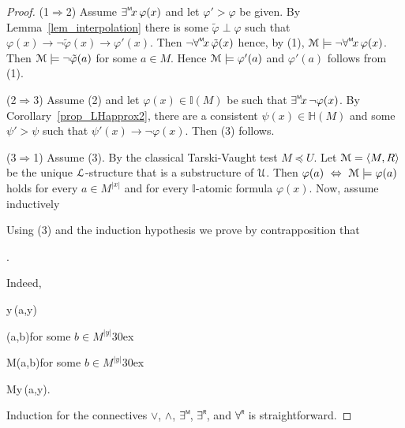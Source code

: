 \documentclass[11pt,oneside]{amsart}
\begin{document}
\begin{proof}
  (1$\Rightarrow$2) Assume $\existsM x\,\varphi(x)$ and let $\varphi'>\varphi$ be given.
  By Lemma~\ref{lem_interpolation} there is some $\tilde{\varphi}\perp\varphi$ such that  $\varphi(x)\rightarrow\neg\tilde{\varphi}(x)\rightarrow\varphi'(x)$.
  Then $\neg\forallM x\,\tilde{\varphi}(x)$ hence, by (1), ${\EuScript M}\models\neg\forallM x\,\varphi(x)$.
  Then ${\EuScript M}\models\neg\tilde{\varphi}(a)$ for some $a\in M$. Hence ${\EuScript M}\models\varphi'(a)$ and $\varphi'(a)$ follows from (1).

  (2$\Rightarrow$3)
  Assume (2) and let $\varphi(x)\in\mathds{I}(M)$ be such that $\existsM x\,\neg\varphi(x)$.
  By Corollary~\ref{prop_LHapprox2}, there are a consistent $\psi(x)\in\mathds{H}(M)$ and some $\psi'>\psi$ such that $\psi'(x)\rightarrow\neg\varphi(x)$.
  Then (3) follows.

  (3$\Rightarrow$1)
  Assume (3).
  By the classical Tarski-Vaught test $M\preceq U$.
  Let ${\EuScript M}=\langle M,R\rangle$ be the unique  ${\EuScript L}$-structure that is a substructure of ${\EuScript U}$.
  Then  $\varphi(a)\ \Leftrightarrow\ {\EuScript M}\models\varphi(a)$ holds for every $a\in M^{|x|}$ and for every $\mathds{I}$-atomic formula $\varphi(x)$.
  Now, assume inductively
  

  Using (3) and the induction hypothesis we prove by contrapposition that

  .

  Indeed,

  {\Rightarrow}{\existsM y\,\neg\varphi(a,y)}
  
  \ceq{}
  {\Rightarrow}
  {\neg\varphi(a,b)}\hfill for some $b\in M^{|y|}$\kern30ex

  \ceq{}
  {\Rightarrow}
  {{\EuScript M}\models\neg\varphi(a,b)}\hfill for some $b\in M^{|y|}$\kern30ex

  \ceq{}
  {\Rightarrow}
  {{\EuScript M}\not\models\forallM y\,\varphi(a,y).}

  Induction for the connectives $\vee$, $\wedge$, $\existsM $, $\existsR $, and $\forallR $ is straightforward.
\end{proof}

\end{document}
